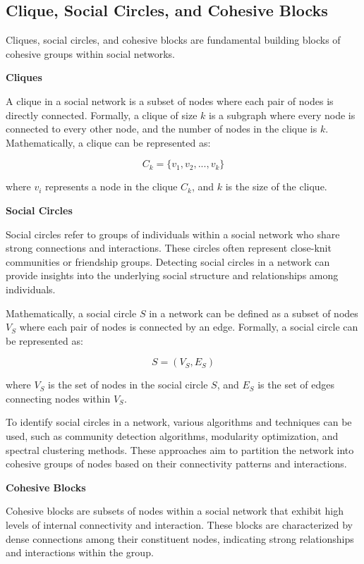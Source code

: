 \documentclass[12pt]{book} %
\begin{document}
\subsection{Clique, Social Circles, and Cohesive Blocks}

Cliques, social circles, and cohesive blocks are fundamental building blocks of cohesive groups within social networks.

\textbf{Cliques}

A clique in a social network is a subset of nodes where each pair of nodes is directly connected. Formally, a clique of size \(k\) is a subgraph where every node is connected to every other node, and the number of nodes in the clique is \(k\). Mathematically, a clique can be represented as:

\[ C_k = \{v_1, v_2, ..., v_k\} \]

where \(v_i\) represents a node in the clique \(C_k\), and \(k\) is the size of the clique.

\textbf{Social Circles}

Social circles refer to groups of individuals within a social network who share strong connections and interactions. These circles often represent close-knit communities or friendship groups. Detecting social circles in a network can provide insights into the underlying social structure and relationships among individuals.

Mathematically, a social circle \(S\) in a network can be defined as a subset of nodes \(V_S\) where each pair of nodes is connected by an edge. Formally, a social circle can be represented as:

\[ S = (V_S, E_S) \]

where \(V_S\) is the set of nodes in the social circle \(S\), and \(E_S\) is the set of edges connecting nodes within \(V_S\).

To identify social circles in a network, various algorithms and techniques can be used, such as community detection algorithms, modularity optimization, and spectral clustering methods. These approaches aim to partition the network into cohesive groups of nodes based on their connectivity patterns and interactions.


\textbf{Cohesive Blocks}

Cohesive blocks are subsets of nodes within a social network that exhibit high levels of internal connectivity and interaction. These blocks are characterized by dense connections among their constituent nodes, indicating strong relationships and interactions within the group.
\end{document}
